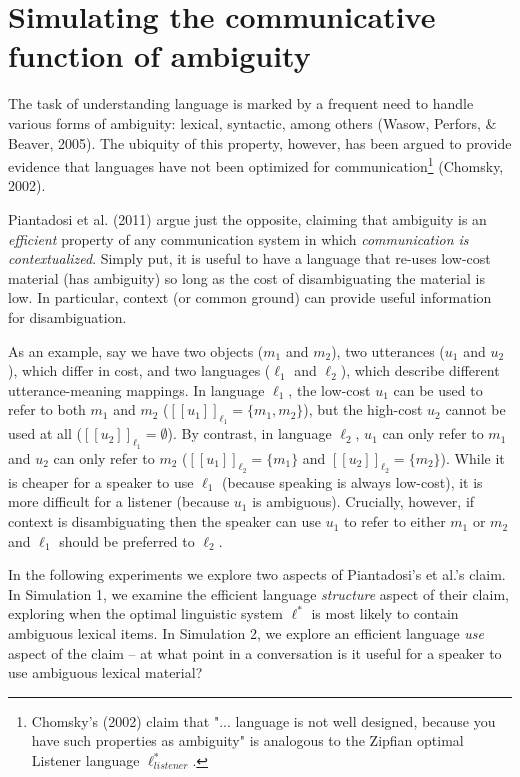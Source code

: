 \documentclass[10pt, letterpaper]{article}
\begin{document}
\section{Simulating the communicative function of
ambiguity}\label{simulating-the-communicative-function-of-ambiguity}

The task of understanding language is marked by a frequent need to
handle various forms of ambiguity: lexical, syntactic, among others
(Wasow, Perfors, \& Beaver, 2005). The ubiquity of this property,
however, has been argued to provide evidence that languages have not
been optimized for
communication\footnote{Chomsky's (2002) claim that "... language is not well designed, because you have such properties as ambiguity" is analogous to the Zipfian optimal Listener language $\ell_{listener}^*$.}
(Chomsky, 2002).

Piantadosi et al. (2011) argue just the opposite, claiming that
ambiguity is an \emph{efficient} property of any communication system in
which \emph{communication is contextualized}. Simply put, it is useful
to have a language that re-uses low-cost material (has ambiguity) so
long as the cost of disambiguating the material is low. In particular,
context (or common ground) can provide useful information for
disambiguation.\par

As an example, say we have two objects (\(m_1\) and \(m_2\)), two
utterances (\(u_1\) and \(u_2\)), which differ in cost, and two
languages (\(\ell_1\) and \(\ell_2\)), which describe different
utterance-meaning mappings. In language \(\ell_1\), the low-cost \(u_1\)
can be used to refer to both \(m_1\) and \(m_2\)
(\([[u_1]]_{\ell_1} = \{m_1, m_2 \}\)), but the high-cost \(u_2\) cannot
be used at all (\([[u_2]]_{\ell_1} = \emptyset\)). By contrast, in
language \(\ell_2\), \(u_1\) can only refer to \(m_1\) and \(u_2\) can
only refer to \(m_2\) (\([[u_1]]_{\ell_2} = \{m_1\}\) and
\([[u_2]]_{\ell_2} = \{m_2 \}\)). While it is cheaper for a speaker to
use \(\ell_1\) (because speaking is always low-cost), it is more
difficult for a listener (because \(u_1\) is ambiguous). Crucially,
however, if context is disambiguating then the speaker can use \(u_1\)
to refer to either \(m_1\) or \(m_2\) and \(\ell_1\) should be preferred
to \(\ell_2\).\par

In the following experiments we explore two aspects of Piantadosi's et
al.'s claim. In Simulation 1, we examine the efficient language
\emph{structure} aspect of their claim, exploring when the optimal
linguistic system \(\ell^*\) is most likely to contain ambiguous lexical
items. In Simulation 2, we explore an efficient language \emph{use}
aspect of the claim -- at what point in a conversation is it useful for
a speaker to use ambiguous lexical material?\par
\end{document}
